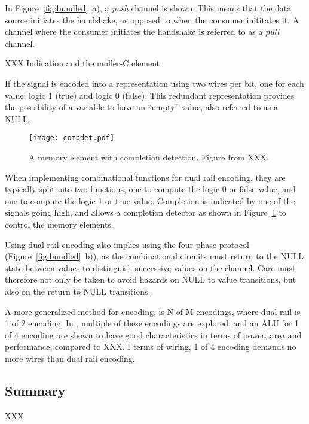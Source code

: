 In Figure~\ref{fig:bundled}~a), a \emph{push} channel is shown. This means
that the data source initiates the handshake, as opposed to when the
consumer inititates it. A channel where the consumer initiates the
handshake is referred to as a \emph{pull} channel.

XXX Indication and the muller-C element

If the signal is encoded into a representation using two wires per
bit, one for each value; logic 1 (true) and logic 0 (false). This
redundant representation provides the possibility of a variable to
have an ``empty'' value, also referred to as a NULL. 

\begin{figure}[htbp]
  \centering
  \texttt{[image: compdet.pdf]}
  \caption{A memory element with completion detection. Figure from XXX.}
  \label{fig:compdet}
\end{figure}

When implementing combinational functions for dual rail encoding, they
are typically split into two functions; one to compute the logic
0 or false value, and one to compute the logic 1 or true
value. Completion is indicated by one of the signals going high, and
allows a completion detector as shown in Figure~\ref{fig:compdet} to
control the memory elements.

Using dual rail encoding also implies using the four phase protocol
(Figure~\ref{fig:bundled}~b)), as the combinational circuits must
return to the NULL state between values to distinguish successive
values on the channel. Care must therefore not only be taken to avoid
hazards on NULL to value transitions, but also on the return to NULL
transitions.

A more generalized method for encoding, is N of M encodings, where
dual rail is 1 of 2 encoding. In \cite{nullconv}, multiple of these
encodings are explored, and an ALU for 1 of 4 encoding are shown to
have good characteristics in terms of power, area and performance,
compared to XXX. I terms of wiring, 1 of 4 encoding demands no more
wires than dual rail encoding. 

\subsection{Summary}

XXX


